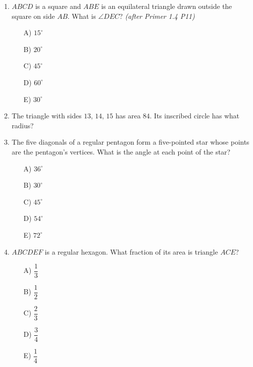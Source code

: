 \documentclass[11pt,a4paper]{article}
\begin{document}
\begin{enumerate}
\item \begin{minipage}[t]{0.60\linewidth}
$ABCD$ is a square and $ABE$ is an equilateral triangle drawn outside the square on side $AB$. What is $\angle DEC$? \textit{\small(after Primer 1.4 P11)}
\begin{itemize}
\item[A)] $15^\circ$
\item[B)] $20^\circ$
\item[C)] $45^\circ$
\item[D)] $60^\circ$
\item[E)] $30^\circ$
\end{itemize}
\end{minipage}\hfill
\begin{minipage}[t]{0.34\linewidth}
\vspace{0pt}
\centering
{}
\end{minipage}

\item The triangle with sides $13$, $14$, $15$ has area $84$. Its inscribed circle has what radius?

\item The five diagonals of a regular pentagon form a five-pointed star whose points are the pentagon's vertices. What is the angle at each point of the star?
\begin{itemize}
\item[A)] $36^\circ$
\item[B)] $30^\circ$
\item[C)] $45^\circ$
\item[D)] $54^\circ$
\item[E)] $72^\circ$
\end{itemize}

\item $ABCDEF$ is a regular hexagon. What fraction of its area is triangle $ACE$?
\begin{itemize}
\item[A)] $\dfrac13$
\item[B)] $\dfrac12$
\item[C)] $\dfrac23$
\item[D)] $\dfrac34$
\item[E)] $\dfrac14$
\end{itemize}


\end{enumerate}
\end{document}
